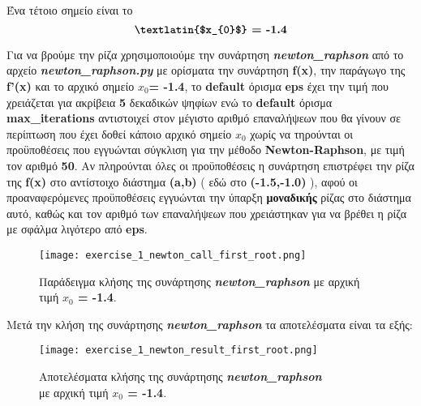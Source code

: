 \documentclass[First Project.tex]{subfiles}
\begin{document}
Ένα τέτοιο σημείο είναι το 
\begin{equation*}
   \textbf{\textlatin{$x_{0}$} = -1.4}
\end{equation*}


Για να βρούμε την ρίζα χρησιμοποιούμε την συνάρτηση \textit{\textlatin{\textbf{newton\_raphson}}} από το αρχείο 
\textit{\textlatin{\textbf{newton\_raphson.py}}} με ορίσματα την συνάρτηση \textlatin{\textbf{f(x)}}, την παράγωγο της 
\textlatin{\textbf{f'(x)}} και το αρχικό σημείο \textlatin{\textbf{$x_{0}$= -1.4}}, το \textlatin{\textbf{default}} όρισμα 
\textlatin{\textbf{eps}} έχει την τιμή που χρειάζεται για ακρίβεια \textbf{5} δεκαδικών ψηφίων ενώ το \textlatin{\textbf{default}} 
όρισμα \textlatin{\textbf{max\_iterations}} αντιστοιχεί στον μέγιστο αριθμό επαναλήψεων που θα γίνουν σε περίπτωση που έχει δοθεί κάποιο 
αρχικό σημείο \textbf{\textlatin{$x_{0}$}} χωρίς να τηρούνται οι προϋποθέσεις που εγγυώνται σύγκλιση για την μέθοδο \textlatin{\textbf{Newton-Raphson}}, 
με τιμή τον αριθμό \textbf{50}. Αν πληρούνται όλες οι προϋποθέσεις η συνάρτηση επιστρέφει την ρίζα της \textlatin{\textbf{f(x)}} στο αντίστοιχο
διάστημα \textlatin{\textbf{(a,b)}} ( εδώ στο \textlatin{\textbf{(-1.5,-1.0)}} ), αφού οι προαναφερόμενες προϋποθέσεις εγγυώνται την ύπαρξη 
\textbf{μοναδικής} ρίζας στο διάστημα αυτό, καθώς και τον αριθμό των επαναλήψεων που χρειάστηκαν για να βρέθει η ρίζα με σφάλμα λιγότερο 
από \textlatin{\textbf{eps}}.
\vspace{5px}
\begin{figure}[hp]
    \centering
    \captionsetup{justification=centering}
    \begin{center}
        \texttt{[image: exercise\_1\_newton\_call\_first\_root.png]}    
        \caption{Παράδειγμα κλήσης της συνάρτησης \textit{\textlatin{\textbf{newton\_raphson}}} με αρχική τιμή \textbf{\textlatin{$x_{0}$ = -1.4}}.}
    \end{center}
\end{figure}


Μετά την κλήση της συνάρτησης \textit{\textlatin{\textbf{newton\_raphson}}} τα αποτελέσματα είναι τα εξής:
\vspace{5px}
\begin{figure}[hp]
    \centering
    \captionsetup{justification=centering}
    \begin{center}
    \texttt{[image: exercise\_1\_newton\_result\_first\_root.png]}    
    \caption{ Αποτελέσματα κλήσης της συνάρτησης \textit{\textlatin{\textbf{newton\_raphson}}} \\ με αρχική τιμή \textbf{\textlatin{$x_{0}$ = -1.4}}. }
    \end{center}
\end{figure}
\end{document}
